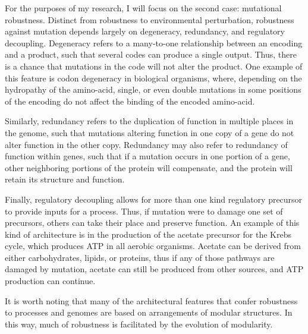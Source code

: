 \documentclass[PhD]{msu-thesis}
\begin{document}
For the purposes of my research, I will focus on the second case: mutational robustness. Distinct from robustness to environmental perturbation, robustness against mutation depends largely on degeneracy, redundancy, and regulatory decoupling\cite{kitano_biological_2004}. Degeneracy refers to a many-to-one relationship between an encoding and a product, such that several codes can produce a single output. Thus, there is a chance that mutations in the code will not alter the product. One example of this feature is codon degeneracy in biological organisms, where, depending on the hydropathy of the amino-acid, single, or even double mutations in some positions of the encoding do not affect the binding of the encoded amino-acid\cite{whitacre_degeneracy:_2010}.

Similarly, redundancy refers to the duplication of function in multiple places in the genome, such that mutations altering function in one copy of a gene do not alter function in the other copy. Redundancy may also refer to redundancy of function within genes, such that if a mutation occurs in one portion of a gene, other neighboring portions of the protein will compensate, and the protein will retain its structure and function.\cite{wagner_distributed_2005} 

Finally, regulatory decoupling allows for more than one kind regulatory precursor to provide inputs for a process\cite{wagner_distributed_2005}. Thus, if mutation were to damage one set of precursors, others can take their place and preserve function. An example of this kind of architecture is in the production of the acetate precursor for the Krebs cycle, which produces ATP in all aerobic organisms\cite{baldwin_evolution_1981}. Acetate can be derived from either carbohydrates, lipids, or proteins, thus if any of those pathways are damaged by mutation, acetate can still be produced from other sources, and ATP production can continue.

It is worth noting that many of the architectural features that confer robustness to processes and genomes are based on arrangements of modular structures\cite{stelling_robustness_2004,wagner_road_2007}. In this way, much of robustness is facilitated by the evolution of modularity.
\end{document}

